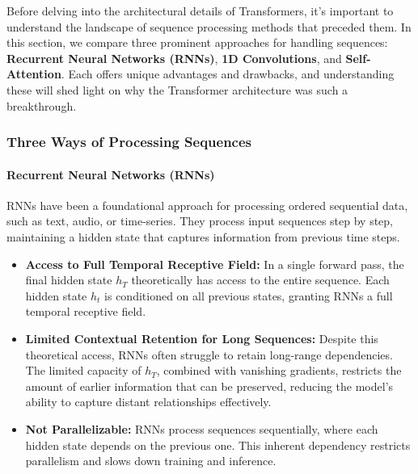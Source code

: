 \noindent Before delving into the architectural details of Transformers, it's important to understand the landscape of sequence processing methods that preceded them. In this section, we compare three prominent approaches for handling sequences: \textbf{Recurrent Neural Networks (RNNs)}, \textbf{1D Convolutions}, and \textbf{Self-Attention}. Each offers unique advantages and drawbacks, and understanding these will shed light on why the Transformer architecture was such a breakthrough.

\subsubsection{Three Ways of Processing Sequences}

\paragraph{Recurrent Neural Networks (RNNs)}

\noindent RNNs have been a foundational approach for processing ordered sequential data, such as text, audio, or time-series. They process input sequences step by step, maintaining a hidden state that captures information from previous time steps.

\begin{itemize}
    \item \textcolor[rgb]{0.0, 0.5, 0.0}{\textbf{Access to Full Temporal Receptive Field:}} In a single forward pass, the final hidden state \( h_T \) theoretically has access to the entire sequence. Each hidden state \( h_t \) is conditioned on all previous states, granting RNNs a full temporal receptive field.
    
    \item \textcolor[rgb]{0.8, 0.0, 0.0}{\textbf{Limited Contextual Retention for Long Sequences:}} Despite this theoretical access, RNNs often struggle to retain long-range dependencies. The limited capacity of \( h_T \), combined with vanishing gradients, restricts the amount of earlier information that can be preserved, reducing the model’s ability to capture distant relationships effectively.
    
    \item \textcolor[rgb]{0.8, 0.0, 0.0}{\textbf{Not Parallelizable:}} RNNs process sequences sequentially, where each hidden state depends on the previous one. This inherent dependency restricts parallelism and slows down training and inference.
\end{itemize}

